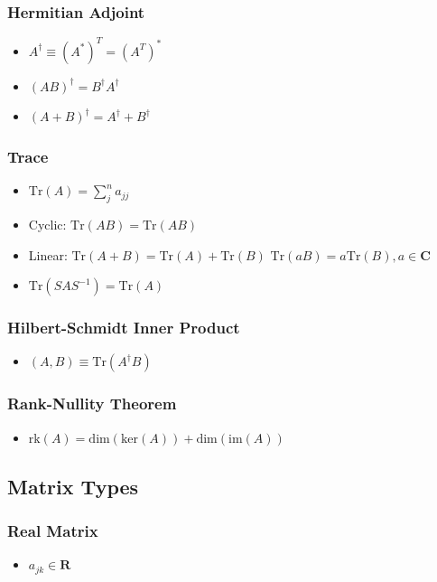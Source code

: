 \documentclass[]{report}
\newcommand \tab[1][1cm]{\hspace*{#1}}
\newcommand{\itemt}{\item \tab}
\begin{document}
\subsubsection{Hermitian Adjoint}			
\begin{itemize}
\itemt \( A^\dagger \equiv (A^*)^T = (A^T)^* \)
\itemt \( (AB)^\dagger = B^\dagger A^\dagger \)
\itemt \( (A+B)^\dagger = A^\dagger +B^\dagger \)
\end{itemize}

\subsubsection{Trace}			
\begin{itemize}
\itemt \( \mathrm{Tr} (A) = \sum\limits_{j}^{n} a_{jj} \)
\itemt Cyclic: \( \mathrm{Tr} (AB) = \mathrm{Tr} (AB) \)
\itemt Linear: \( \mathrm{Tr} (A+B) = \mathrm{Tr} (A)+\mathrm{Tr} (B) \)
\subitem \hspace*{1cm} \( \mathrm{Tr} (aB) = a \mathrm{Tr} (B) , a \in \mathbf{C} \)
\itemt \( \mathrm{Tr} (SAS^{-1}) = \mathrm{Tr} (A) \)
\end{itemize}

\subsubsection{Hilbert-Schmidt Inner Product}			
\begin{itemize}
\itemt \( (A,B) \equiv \mathrm{Tr} (A^{\dagger}B) \)
\end{itemize}

\subsubsection{Rank-Nullity Theorem}			
\begin{itemize}
\itemt \( \mathrm{rk} (A) = \mathrm{dim} (\mathrm{ker} (A))+\mathrm{dim} (\mathrm{im} (A)) \)
\end{itemize}

\subsection{Matrix Types}

\subsubsection{Real Matrix}			
\begin{itemize}
\itemt \( a_{jk} \in \mathbf{R} \)
\end{itemize}
\end{document}

